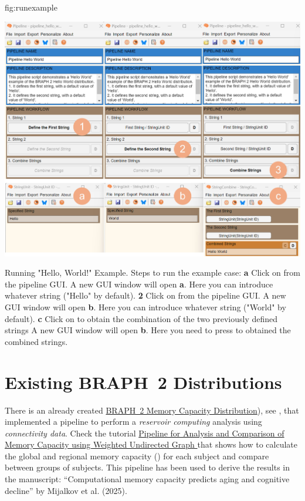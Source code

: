 \documentclass{tufte-handout}
\begin{document}


{fig:runexample}
{\centerline{\includegraphics{fig03.jpg}}}
{Running "Hello, World!" Example.}
{
	Steps to run the example case:
	{\bf a} Click on  from the pipeline GUI. A new GUI window will open {\bf a}. Here you can introduce whatever string ("Hello" by default).
	{\bf 2} Click on  from the pipeline GUI. A new GUI window will open {\bf b}. Here you can introduce whatever string ("World" by default).
	{\bf c} Click on  to obtain the combination of the two previously defined strings A new GUI window will open {\bf b}. Here you need to press   to obtained the combined strings. 
}


\clearpage
\section{Existing BRAPH~2 Distributions}

There is an already created \href{https://github.com/braph-software/MemoryCapacity}{BRAPH~2 Memory Capacity Distribution}), see , that implemented a pipeline to perform a \emph{reservoir computing} analysis using \emph{connectivity data}. Check the tutorial \href{https://github.com/braph-software/MemoryCapacity/tree/develop/tutorials/tut_mc_wu}{Pipeline for Analysis and Comparison of Memory Capacity using Weighted Undirected Graph
} that shows how to calculate the global and regional memory capacity () for each subject and compare between groups of subjects. This pipeline has been used to derive the results in the manuscript: “Computational memory capacity predicts aging and cognitive decline” by Mijalkov et al. (2025).
\end{document}
